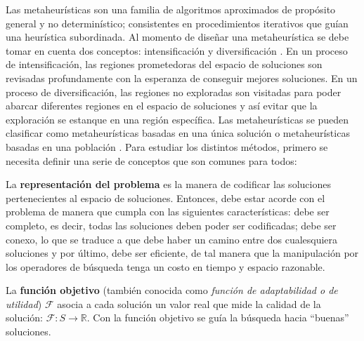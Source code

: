 
Las metaheurísticas son una familia de algoritmos aproximados de propósito general y no determinístico; consistentes en procedimientos iterativos que guían una heurística subordinada. Al momento de diseñar una metaheurística se debe tomar en cuenta dos conceptos: intensificación y diversificación \cite{talbi2009metaheuristics}. En un proceso de intensificación, las regiones prometedoras del espacio de soluciones son revisadas profundamente con la esperanza de conseguir mejores soluciones. En un proceso de diversificación, las regiones no exploradas son visitadas para poder abarcar diferentes regiones en el espacio de soluciones y así evitar que la exploración se estanque en una región específica. Las metaheurísticas se pueden clasificar como metaheurísticas basadas en una única solución o metaheurísticas basadas en una población \cite{talbi2009metaheuristics}. Para estudiar los distintos métodos, primero se necesita definir una serie de conceptos que son comunes para todos:\\

\begin{definicion}
La \textbf{representación del problema} \cite{talbi2009metaheuristics} es la manera de codificar las soluciones pertenecientes al espacio de soluciones. Entonces, debe estar acorde con el problema de manera que cumpla con las siguientes características: debe ser completo, es decir, todas las soluciones deben poder ser codificadas; debe ser conexo, lo que se traduce a que debe haber un camino entre dos cualesquiera soluciones y por último, debe ser eficiente, de tal manera que la manipulación por los operadores de búsqueda tenga un costo en tiempo y espacio razonable.\\
\end{definicion}

\begin{definicion}
La \textbf{función objetivo} \cite{talbi2009metaheuristics} (también conocida como \emph{función de adaptabilidad o de utilidad}) $\mathcal{F}$ asocia a cada solución un valor real que mide la calidad de la solución: $\mathcal{F}: S \rightarrow \mathbb{R}$. Con la función objetivo se guía la búsqueda hacia ``buenas'' soluciones.\\
\end{definicion}


